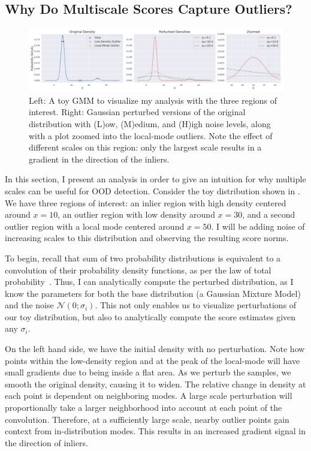 \subsection*{Why Do Multiscale Scores Capture Outliers?}
\begin{figure}[tbhp]
\centering
\includegraphics[width=\linewidth]{figures/gmm_plot_tight.png}
\caption{Left: A toy GMM to visualize my analysis with the three regions of interest. Right: Gaussian perturbed versions of the original distribution with (L)ow, (M)edium, and (H)igh noise levels, along with a plot zoomed into the local-mode outliers. Note the effect of different scales on this region: only the largest scale results in a gradient in the direction of the inliers.}
\label{fig:toygmm}
\end{figure}

 In this section, I present an analysis in order to give an intuition for why multiple scales can be useful for OOD detection. Consider the toy distribution shown in . We have three regions of interest: an inlier region with high density centered around $x=10$, an outlier region with low density around $x=30$, and a second outlier region with a local mode centered around $x=50$. I will be adding noise of increasing scales to this distribution and observing the resulting score norms.

To begin, recall that sum of two probability distributions is equivalent to a convolution of their probability density functions, as per the law of total probability~\cite{sumisconv}. Thus, I can analytically compute the perturbed distribution, as I know the parameters for both the base distribution (a Gaussian Mixture Model) and the noise $\mathcal{N}(0; \sigma_i)$. 
This not only enables us to visualize perturbations of our toy distribution, but also to analytically compute the score estimates given any $\sigma_i$.

On the left hand side, we have the initial density with no perturbation. Note how points within the low-density region and at the peak of the local-mode will have small gradients due to being inside a flat area. As we perturb the samples, we smooth the original density, causing it to widen. The relative change in density at each point is dependent on neighboring modes. A large scale perturbation will proportionally take a larger neighborhood into account at each point of the convolution. Therefore, at a sufficiently large scale, nearby outlier points gain context from in-distribution modes. This results in an increased gradient signal in the direction of inliers. 

